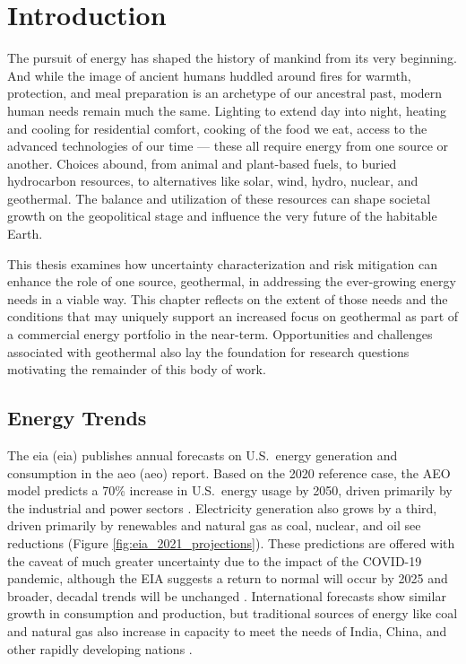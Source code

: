\chapter{Introduction}\label{ch1:intro}
The pursuit of energy has shaped the history of mankind from its very beginning. And while the image of ancient humans huddled around fires for warmth, protection, and meal preparation is an archetype of our ancestral past, modern human needs remain much the same. Lighting to extend day into night, heating and cooling for residential comfort, cooking of the food we eat, access to the advanced technologies of our time --- these all require energy from one source or another. Choices abound, from animal and plant-based fuels, to buried hydrocarbon resources, to alternatives like solar, wind, hydro, nuclear, and geothermal. The balance and utilization of these resources can shape societal growth on the geopolitical stage and influence the very future of the habitable Earth.

This thesis examines how uncertainty characterization and risk mitigation can enhance the role of one source, geothermal, in addressing the ever-growing energy needs in a viable way. This chapter reflects on the extent of those needs and the conditions that may uniquely support an increased focus on geothermal as part of a commercial energy portfolio in the near-term. Opportunities and challenges associated with geothermal also lay the foundation for research questions motivating the remainder of this body of work.

\section{Energy Trends}\label{ch1:trends}
The \acrlong{eia} (\acrshort{eia}) publishes annual forecasts on U.S.\ energy generation and consumption in the \acrlong{aeo} (\acrshort{aeo}) report. Based on the 2020 reference case, the AEO model predicts a 70\% increase in U.S.\ energy usage by 2050, driven primarily by the industrial and power sectors \citep{us_energy_information_administration_annual_2021}. Electricity generation also grows by a third, driven primarily by renewables and natural gas as coal, nuclear, and oil see reductions (Figure \ref{fig:eia_2021_projections}). These predictions are offered with the caveat of much greater uncertainty due to the impact of the COVID-19 pandemic, although the EIA suggests a return to normal will occur by 2025 and broader, decadal trends will be unchanged \citep{us_energy_information_administration_annual_2021}. International forecasts show similar growth in consumption and production, but traditional sources of energy like coal and natural gas also increase in capacity to meet the needs of India, China, and other rapidly developing nations \citep{us_energy_information_administration_international_2020}. 
 
